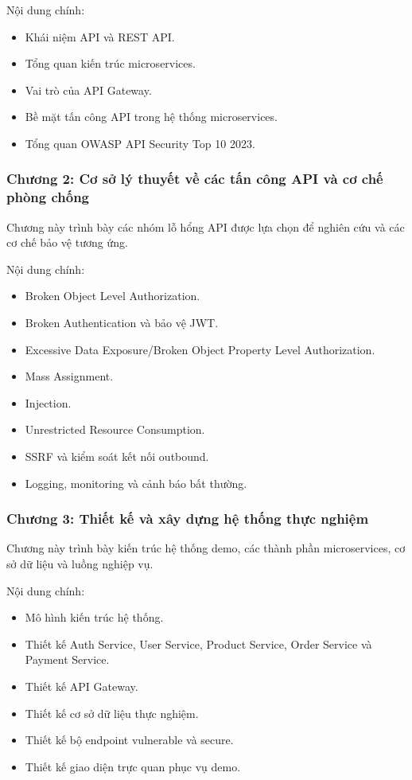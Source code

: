 \documentclass[14pt,a4paper]{extarticle}
\begin{document}
Nội dung chính:
\begin{itemize}
  \item Khái niệm API và REST API.
  \item Tổng quan kiến trúc microservices.
  \item Vai trò của API Gateway.
  \item Bề mặt tấn công API trong hệ thống microservices.
  \item Tổng quan OWASP API Security Top 10 2023.
\end{itemize}

\subsubsection*{Chương 2: Cơ sở lý thuyết về các tấn công API và cơ chế phòng chống}
Chương này trình bày các nhóm lỗ hổng API được lựa chọn để nghiên cứu và các cơ chế bảo vệ tương ứng.

Nội dung chính:
\begin{itemize}
  \item Broken Object Level Authorization.
  \item Broken Authentication và bảo vệ JWT.
  \item Excessive Data Exposure/Broken Object Property Level Authorization.
  \item Mass Assignment.
  \item Injection.
  \item Unrestricted Resource Consumption.
  \item SSRF và kiểm soát kết nối outbound.
  \item Logging, monitoring và cảnh báo bất thường.
\end{itemize}

\subsubsection*{Chương 3: Thiết kế và xây dựng hệ thống thực nghiệm}
Chương này trình bày kiến trúc hệ thống demo, các thành phần microservices, cơ sở dữ liệu và luồng nghiệp vụ.

Nội dung chính:
\begin{itemize}
  \item Mô hình kiến trúc hệ thống.
  \item Thiết kế Auth Service, User Service, Product Service, Order Service và Payment Service.
  \item Thiết kế API Gateway.
  \item Thiết kế cơ sở dữ liệu thực nghiệm.
  \item Thiết kế bộ endpoint vulnerable và secure.
  \item Thiết kế giao diện trực quan phục vụ demo.
\end{itemize}
\end{document}
